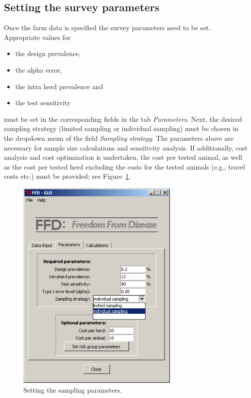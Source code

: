 \documentclass[nojss]{jss}
\begin{document}
\subsection{Setting the survey parameters} \label{subsec:GUI_survey_parameters}

Once the farm data is specified the survey parameters need to be set. Appropriate values for
%
\begin{itemize}
\item the design prevalence,
\item the alpha error,
\item the intra herd prevalence and
\item the test sensitivity
\end{itemize}
%
must be set in the corresponding fields in the tab  \emph{Parameters}. Next, the desired sampling strategy (limited sampling or individual sampling) must be chosen in the dropdown menu of the field  \emph{Sampling strategy}. The parameters above are necessary for sample size calculations and sensitivity analysis. If additionally, cost analysis and cost optimization is undertaken, the cost per tested animal, as well as the cost per tested herd excluding the costs for the tested animals (e.g., travel costs etc.) must be provided; see Figure~\ref{fig:GUI_Parameters}.

\begin{figure}[h!t]
\begin{center}
\includegraphics[width=80mm]{GUI_Parameters.png}
\end{center}
\caption{Setting the sampling parameters.} \label{fig:GUI_Parameters}
\end{figure}
\end{document}
